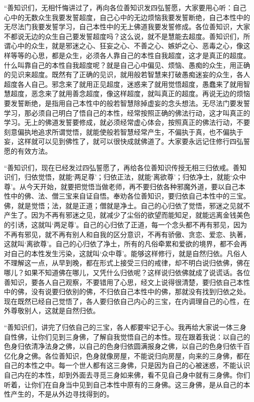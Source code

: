 \documentclass[12pt,twoside,openany]{book}
\newcommand{\kai}[1]{{\CJKfamily{kai}#1}}
\begin{document}
\kai{“善知识们，无相忏悔讲过了，再向各位善知识发四弘誓愿，大家要用心听：自己心中的无数众生我要发誓超度，自己心中的无边烦恼我要发誓断绝，自己本性中的无尽法门我要发誓学习，自己本性中的无上佛道我要发誓修成。各位善知识，大家不都说无边的众生自己要发誓超度吗？这么说，就不是慧能去超度。善知识们，所谓心中的众生，就是邪迷之心、狂妄之心、不善之心、嫉妒之心、恶毒之心，像这样等等的心思，都是众生，必须各人靠自己的本性自我超度，这才是真正的超度。什么叫靠自己的本性自我超度呢？就是自己心中偏见、烦恼、愚痴的众生，用正确的见识来超度。既然有了正确的见识，就用般若智慧来打破愚痴迷妄的众生，各人超度各人自己。邪念来了就用正见超度，迷惑来了就用觉悟超度，愚蠢来了就用智慧超度，恶念来了就用善念超度，像这样超度，就叫真正的超度。再说无边的烦恼要发誓断绝，是指用自己本性中的般若智慧除掉虚妄的念头想法。无尽法门要发誓学习，那必须自己明白了悟自己的本性，经常按照正确的佛法行动，这才叫真正的学习。无上的佛道发誓要修成，就必须经常虚心体会，按照真正的佛法行动，不要刻意偏执地追求所谓觉悟，就能使般若智慧经常产生，不偏执于真，也不偏执于妄，这样就可以见到佛性了，就可以很快成就佛道了。大家要永远记住修行四弘誓愿的有效方法。
	
“善知识们，现在已经发过四弘誓愿了，再给各位善知识传授无相三归依戒。善知识们，归依觉悟，就能‘两足尊’；归依正法，就能‘离欲尊’；归依净土，就能‘众中尊’。从今天开始，就要把觉悟当做老师，再不要归依各种邪魔外道，要以自己本性中的佛、法、僧三宝来自证自悟。奉劝各位善知识，要归依自己本性中的三宝。佛，就是觉悟；法，就是正道；僧就是净土。自己的心归依了觉悟，邪迷之见就不产生了。因为不再有邪迷之见，就减少了尘俗的欲望而能知足，就能远离金钱美色的引诱，这就叫‘两足尊’。自己的心归依了正道，每一个念头都不再有邪见，因为不再有邪见，就不再有别人和自我的区分意识，不再有骄傲、贪恋、爱恋、执著，这就叫‘离欲尊’。自己的心归依了净土，所有的凡俗牵累和爱欲的境界，都不会再对自己的本性发生污染，这就叫‘众中尊’。能够这样修行，就是自然归依。凡俗人不理解这一点，从早到晚，都在形式上接受三归的戒律，却不明白说归依佛，佛在哪儿？如果不知道佛在哪儿，又凭什么归依呢？这样说归依佛就成了说谎话。各位善知识，要各人自己观察，不要错用了心思，经文上说得很清楚，要归依自己本性中的佛，没有说要归依别的佛，不归依自己本性中的佛，那就没有找到归依之处。现在既然已经自己觉悟了，各人要归依自己内心的三宝，在内调理自己的心性，在外尊敬别人，这就是自然归依。

“善知识们，讲完了归依自己的三宝，各人都要牢记于心。我再给大家说一体三身自性佛，让你们见到三身佛，了解自我觉悟自己的本性。现在跟着我说：以自己的色身归依清净法身之佛，以自己的色身归依圆满报身之佛，以自己的色身归依千百亿化身之佛。各位善知识，色身就像房屋，不能说归向房屋，向来的三身佛，都在自己的本性之中。每一个世人都有这三身佛，只是因为自己的心被迷惑，不能认识自己内在的本性，却到外面去寻觅三身如来佛，看不见自己身中就有三身佛。你们听着，让你们在自身当中见到自己本性中原有的三身佛。这三身佛，是从自己的本性产生的，不是从外边寻找得到的。

}
\end{document}
